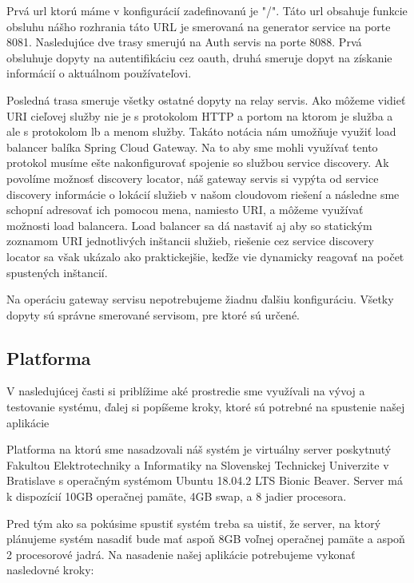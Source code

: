 Prvá \acrshort{url} ktorú máme v konfigurácií zadefinovanú je "/". Táto \acrshort{url} obsahuje funkcie obsluhu nášho rozhrania táto URL je smerovaná na generator service na porte 8081.
Nasledujúce dve trasy smerujú na Auth servis na porte 8088. Prvá obsluhuje dopyty na autentifikáciu cez \acrshort{oauth}, druhá smeruje dopyt na získanie informácií o aktuálnom používateľovi.

Posledná trasa smeruje všetky ostatné dopyty na relay servis. Ako môžeme vidieť URI cieľovej služby nie je s protokolom HTTP a portom na ktorom je služba a ale s protokolom lb a menom služby. Takáto notácia nám umožňuje využiť load balancer balíka Spring Cloud Gateway. Na to aby sme mohli využívať tento protokol musíme ešte nakonfigurovať spojenie so službou service discovery. Ak povolíme možnosť discovery locator, náš gateway servis si vypýta od service discovery informácie o lokácií služieb v našom cloudovom riešení a následne sme schopní adresovať ich pomocou mena, namiesto URI, a môžeme využívať možnosti load balancera. Load balancer sa dá nastaviť aj aby so statickým zoznamom URI jednotlivých inštancii služieb, riešenie cez service discovery locator sa však ukázalo ako praktickejšie, keďže vie dynamicky reagovať na počet spustených inštancií.

Na operáciu gateway servisu nepotrebujeme žiadnu ďalšiu konfiguráciu. Všetky dopyty sú správne smerované servisom, pre ktoré sú určené.

\subsection{Platforma}
V nasledujúcej časti si priblížime aké prostredie sme využívali na vývoj a testovanie systému, ďalej si popíšeme kroky, ktoré sú potrebné na spustenie našej aplikácie

Platforma na ktorú sme nasadzovali náš systém je virtuálny server poskytnutý Fakultou Elektrotechniky a Informatiky na Slovenskej Technickej Univerzite v Bratislave s operačným systémom Ubuntu 18.04.2 LTS Bionic Beaver. Server má k dispozícií 10GB operačnej pamäte, 4GB swap, a 8 jadier procesora.

Pred tým ako sa pokúsime spustiť systém treba sa uistiť, že server, na ktorý plánujeme systém nasadiť bude mať aspoň 8GB voľnej operačnej pamäte a aspoň 2 procesorové jadrá.
Na nasadenie našej aplikácie potrebujeme vykonať nasledovné kroky:

